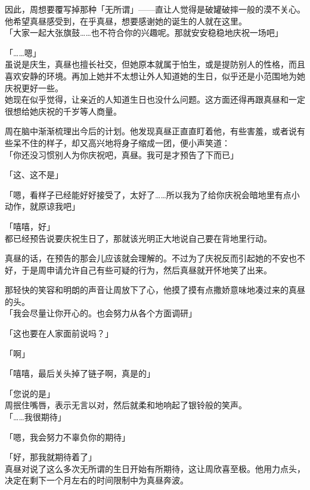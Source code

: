 因此，周想要覆写掉那种「无所谓」——直让人觉得是破罐破摔一般的漠不关心。他希望真昼感受到，在乎真昼，想要感谢她的诞生的人就在这里。\\

「大家一起大张旗鼓……也不符合你的兴趣呢。那就安安稳稳地庆祝一场吧」

「……嗯」\\

虽说是庆生，真昼也擅长社交，但她原本就属于怕生，或是提防别人的性格，而且喜欢安静的环境。再加上她并不太想让外人知道她的生日，似乎还是小范围地为她庆祝更好一些。\\

她现在似乎觉得，让亲近的人知道生日也没什么问题。这方面还得再跟真昼和一定很想给她庆祝的千岁等人商量。

周在脑中渐渐梳理出今后的计划。他发现真昼正直直盯着他，有些害羞，或者说有些呆不住的样子，却又高兴地将身子缩成一团，便小声笑道：\\

「你还没习惯别人为你庆祝吧，真昼。我可是才预告了下而已」

「这、这不是」

「嗯，看样子已经能好好接受了，太好了……所以我为了给你庆祝会暗地里有点小动作，就原谅我吧」

「嘻嘻，好」\\

都已经预告说要庆祝生日了，那就该光明正大地说自己要在背地里行动。

真昼的话，在预告的那会儿应该就会理解的。不过为了庆祝反而引起她的不安也不好，于是周申请允许自己有些可疑的行为，然后真昼就开怀地笑了出来。

那轻快的笑容和明朗的声音让周放下了心，他摸了摸有点撒娇意味地凑过来的真昼的头。\\

「我会尽量让你开心的。也会努力从各个方面调研」

「这也要在人家面前说吗？」

「啊」

「嘻嘻，最后关头掉了链子啊，真是的」

「您说的是」\\

周抿住嘴唇，表示无言以对，然后就柔和地响起了银铃般的笑声。\\

「……我很期待」

「嗯，我会努力不辜负你的期待」

「好，那我就期待着了」\\

真昼对说了这么多次无所谓的生日开始有所期待，这让周欣喜至极。他用力点头，决定在剩下一个月左右的时间限制中为真昼奔波。
